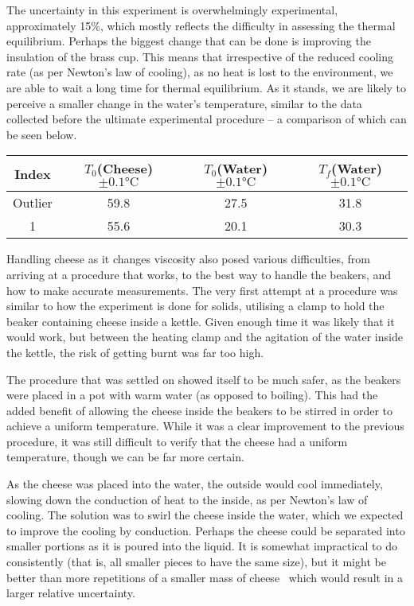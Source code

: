 The uncertainty in this experiment is overwhelmingly experimental, approximately 15\%, which mostly reflects the difficulty in assessing the thermal equilibrium. Perhaps the biggest change that can be done is improving the insulation of the brass cup. This means that irrespective of the reduced cooling rate (as per Newton's law of cooling), as no heat is lost to the environment, we are able to wait a long time for thermal equilibrium. As it stands, we are likely to perceive a smaller change in the water's temperature, similar to the data collected before the ultimate experimental procedure – a comparison of which can be seen below.

\begin{table}[h] \centering
  \begin{tabular} {c|c|c|c}
  	Index & $T_0$(Cheese) $\pm 0.1 \si{\celsius}$& $T_0$(Water) $\pm 0.1 \si{\celsius}$& $T_f$(Water) $ \pm 0.1 \si{\celsius}$\\ \hline
  	Outlier & 59.8 &	27.5 &	31.8 \\
    1 & 55.6 &	20.1 &	30.3 \\
  \end{tabular}
\end{table}

Handling cheese as it changes viscosity also posed various difficulties, from arriving at a procedure that works, to the best way to handle the beakers, and how to make accurate measurements. The very first attempt at a procedure was similar to how the experiment is done for solids, utilising a clamp to hold the beaker containing cheese inside a kettle. Given enough time it was likely that it would work, but between the heating clamp and the agitation of the water inside the kettle, the risk of getting burnt was far too high.

The procedure that was settled on showed itself to be much safer, as the beakers were placed in a pot with warm water (as opposed to boiling). This had the added benefit of allowing the cheese inside the beakers to be stirred in order to achieve a uniform temperature. While it was a clear improvement to the previous procedure, it was still difficult to verify that the cheese had a uniform temperature, though we can be far more certain.

As the cheese was placed into the water, the outside would cool immediately, slowing down the conduction of heat to the inside, as per Newton's law of cooling. The solution was to swirl the cheese inside the water, which we expected to improve the cooling by conduction. Perhaps the cheese could be separated into smaller portions as it is poured into the liquid. It is somewhat impractical to do consistently (that is, all smaller pieces to have the same size), but it might be better than more repetitions of a smaller mass of cheese \textendash\ which would result in a larger relative uncertainty.
